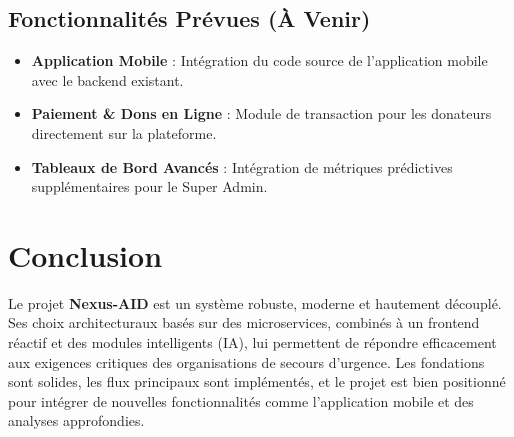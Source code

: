 \documentclass[12pt,a4paper]{report}
\begin{document}
\section{Fonctionnalités Prévues (À Venir)}
\begin{itemize}
    \item \textbf{Application Mobile} : Intégration du code source de l'application mobile avec le backend existant.
    \item \textbf{Paiement \& Dons en Ligne} : Module de transaction pour les donateurs directement sur la plateforme.
    \item \textbf{Tableaux de Bord Avancés} : Intégration de métriques prédictives supplémentaires pour le Super Admin.
\end{itemize}

\chapter{Conclusion}
Le projet \textbf{Nexus-AID} est un système robuste, moderne et hautement découplé. Ses choix architecturaux basés sur des microservices, combinés à un frontend réactif et des modules intelligents (IA), lui permettent de répondre efficacement aux exigences critiques des organisations de secours d'urgence. Les fondations sont solides, les flux principaux sont implémentés, et le projet est bien positionné pour intégrer de nouvelles fonctionnalités comme l'application mobile et des analyses approfondies.
\end{document}
